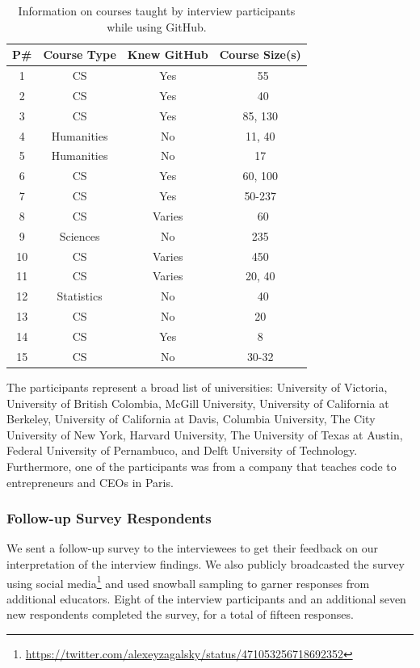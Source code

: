 \begin{table}[h]
    \vspace{1pt}
        \caption{Information on courses taught by interview participants while using GitHub.}\label{table:interviews:github_tutorial}
    \vspace{1pt}
    \begin{center}
        \begin{tabular}{cccc}
            \hline
            P\# & \multicolumn{1}{|c}{Course Type} & \multicolumn{1}{|c}{Knew GitHub} & \multicolumn{1}{|c}{Course Size(s)} \\
            \hline
            1 & CS & Yes & ~55 \\
            2 & CS & Yes & ~40 \\
            3 & CS & Yes & 85, 130 \\
            4 & Humanities & No & 11, 40 \\
            5 & Humanities & No & 17 \\
            6 & CS & Yes & 60, 100 \\
            7 & CS & Yes & 50-237 \\
            8 & CS & Varies & ~60 \\
            9 & Sciences & No & 235 \\
            10 & CS & Varies & 450 \\
            11 & CS & Varies & 20, 40 \\
            12 & Statistics & No & ~40 \\
            13 & CS & No & 20 \\
            14 & CS & Yes & 8 \\
            15 & CS & No & 30-32
        \end{tabular}
    \end{center}
\end{table}
The participants represent a broad list of universities: University of Victoria, University of British Colombia, McGill University, University of California at Berkeley, University of California at Davis, Columbia University, The City University of New York, Harvard University, The University of Texas at Austin, Federal University of Pernambuco, and Delft University of Technology. Furthermore, one of the participants was from a company that teaches code to entrepreneurs and CEOs in Paris.

\subsubsection{Follow-up Survey Respondents}
We sent a follow-up survey to the interviewees to get their feedback on our interpretation of the interview findings. We also publicly broadcasted the survey using social media\footnote{\url{https://twitter.com/alexeyzagalsky/status/471053256718692352}} and used snowball sampling to garner responses from additional educators. Eight of the interview participants and an additional seven new respondents completed the survey, for a total of fifteen responses.

